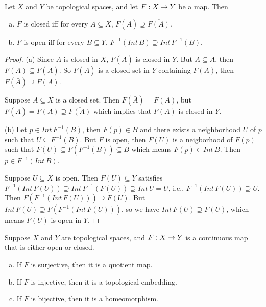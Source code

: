 \documentclass[11pt,a4paper]{article}
\begin{document}
\begin{proposition}
Let $X$ and $Y$ be topological spaces, and let $F:X\rightarrow Y$ be a map. Then 
\begin{enumerate}[(a)]
    \item $F$ is closed iff for every $A\subseteq X$, $F(\bar{A})\supseteq \overline{F(A)}$.
    \item $F$ is open iff for every $B\subseteq Y$, $F^{-1}(Int\,B)\supseteq Int\, F^{-1}(B)$.
\end{enumerate}
\end{proposition}

\begin{proof}
(a) \forward Since $\bar{A}$ is closed in $X$, $F(\bar{A})$ is closed in $Y$. But $A\subseteq \bar{A}$, then $F(A)\subseteq F(\bar{A})$. So $F(\bar{A})$ is a closed set in $Y$ containing $F(A)$, then $F(\bar{A})\supseteq \overline{F(A)}$.

\noindent\converse Suppose $A\subseteq X$ is a closed set. Then $F(\bar{A}) = F(A)$, but $F(\bar{A}) = F(A) \supseteq \overline{F(A)}$ which implies that $F(A)$ is closed in $Y$.

\noindent(b) \forward Let $p\in Int\,F^{-1}(B)$, then $F(p)\in B$ and there exists a neighborhood $U$ of $p$ such that $U\subseteq F^{-1}(B)$. But $F$ is open, then $F(U)$ is a neigborhood of $F(p)$ such that $F(U)\subseteq F(F^{-1}(B))\subseteq B$ which means $F(p)\in Int\,B$. Then $p\in F^{-1}(Int\,B)$.

\noindent\converse Suppose $U\subseteq X$ is open. Then $F(U)\subseteq Y$ satisfies $F^{-1}(Int\,F(U))\supseteq Int\,F^{-1}(F(U))\supseteq Int\,U = U$, i.e., $F^{-1}(Int\,F(U))\supseteq U$. Then $F(F^{-1}(Int\,F(U)))\supseteq F(U)$. But $Int\,F(U)\supseteq F(F^{-1}(Int\,F(U)))$, so we have $Int\,F(U)\supseteq F(U)$, which means $F(U)$ is open in $Y$. 
\end{proof}

\begin{proposition}\label{prop:lemma_to_closed_map_lemma}
Suppose $X$ and $Y$ are topological spaces, and $F:X\rightarrow Y$ is a continuous map that is either open or closed.
\begin{enumerate}[(a)]
    \item If $F$ is surjective, then it is a quotient map.
    \item If $F$ is injective, then it is a topological embedding.
    \item If $F$ is bijective, then it is a homeomorphism.
\end{enumerate}
\end{proposition}
\end{document}
